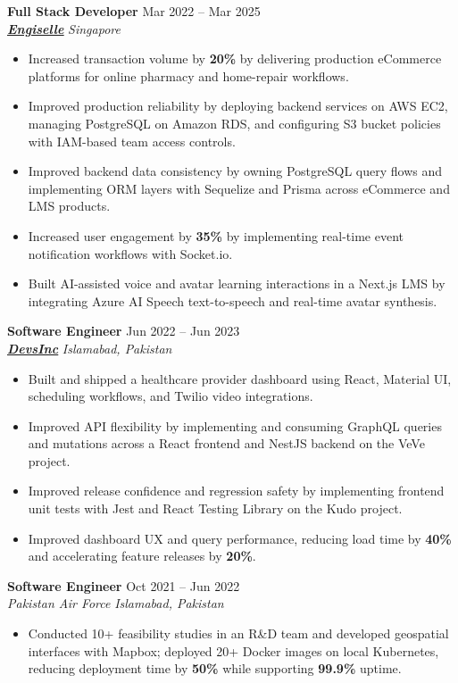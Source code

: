\documentclass[9pt,letterpaper]{article}
\newcommand{\role}[4]{\textbf{#1} \hfill #2 \\
\textit{#3} \hfill \textit{#4}\\[-4pt]}
\begin{document}
\role{Full Stack Developer}{Mar 2022 -- Mar 2025}{\href{https://www.engiselle.com/}{\textbf{\underline{Engiselle}}}}{Singapore}
\begin{itemize}[leftmargin=*, itemsep=0pt, topsep=0pt, partopsep=0pt, parsep=0pt, after=\vspace{2pt}]
  \item Increased transaction volume by \textbf{20\%} by delivering production eCommerce platforms for online pharmacy and home-repair workflows.
  \item Improved production reliability by deploying backend services on AWS EC2, managing PostgreSQL on Amazon RDS, and configuring S3 bucket policies with IAM-based team access controls.
  \item Improved backend data consistency by owning PostgreSQL query flows and implementing ORM layers with Sequelize and Prisma across eCommerce and LMS products.
  \item Increased user engagement by \textbf{35\%} by implementing real-time event notification workflows with Socket.io.
  \item Built AI-assisted voice and avatar learning interactions in a Next.js LMS by integrating Azure AI Speech text-to-speech and real-time avatar synthesis.
\end{itemize}

\role{Software Engineer}{Jun 2022 -- Jun 2023}{\href{https://www.devsinc.com/}{\textbf{\underline{DevsInc}}}}{Islamabad, Pakistan}
\begin{itemize}[leftmargin=*, itemsep=0pt, topsep=0pt, partopsep=0pt, parsep=0pt, after=\vspace{2pt}]
  \item Built and shipped a healthcare provider dashboard using React, Material UI, scheduling workflows, and Twilio video integrations.
  \item Improved API flexibility by implementing and consuming GraphQL queries and mutations across a React frontend and NestJS backend on the VeVe project.
  \item Improved release confidence and regression safety by implementing frontend unit tests with Jest and React Testing Library on the Kudo project.
  \item Improved dashboard UX and query performance, reducing load time by \textbf{40\%} and accelerating feature releases by \textbf{20\%}.
\end{itemize}

\role{Software Engineer}{Oct 2021 -- Jun 2022}{Pakistan Air Force}{Islamabad, Pakistan}
\begin{itemize}[leftmargin=*, itemsep=0pt, topsep=0pt, partopsep=0pt, parsep=0pt, after=\vspace{2pt}]
  \item Conducted 10+ feasibility studies in an R\&D team and developed geospatial interfaces with Mapbox; deployed 20+ Docker images on local Kubernetes, reducing deployment time by \textbf{50\%} while supporting \textbf{99.9\%} uptime.
\end{itemize}
\end{document}
